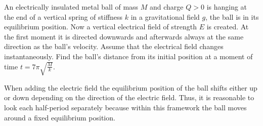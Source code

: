{\ifEngStatement
An electrically insulated metal ball of mass $M$ and charge $Q>0$ is hanging at the end of a vertical spring of stiffness $k$ in a gravitational field $g$, the ball is in its equilibrium position. Now a vertical electrical field of strength $E$ is created. At the first moment it is directed downwards and afterwards always at the same direction as the ball’s velocity. Assume that the electrical field changes instantaneously. Find the ball’s distance from its initial position at a moment of time $t=7\pi \sqrt{\frac{M}{k}}$.
\fi


\ifEngHint
When adding the electric field the equilibrium position of the ball shifts either up or down depending on the direction of the electric field. Thus, it is reasonable to look each half-period separately because within this framework the ball moves around a fixed equilibrium position.
\fi


}
